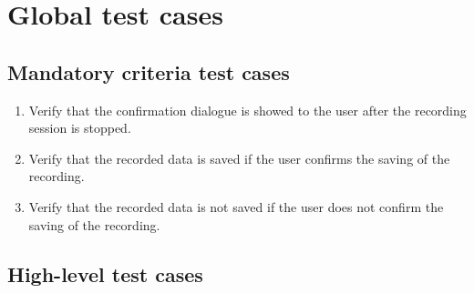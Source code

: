 \chapter{Global test cases}
\label{ch:tests}

\newcommand{\testfor}[1]{\addtocounter{counterTC}{10}\item[TC\arabic{counterTC}\label{TC\arabic{counterTC}}\\\begin{footnotesize}\textit{(tests \specref{#1})}\end{footnotesize}]}
\newcommand{\test}{\addtocounter{counterTC}{10}\item[TC\arabic{counterTC}\label{TC\arabic{counterTC}}]}
\newenvironment{tests}{\begin{enumerate}[font = \normalfont, style = multiline, labelindent = 0em, labelwidth = 5em, labelsep* = 1em, leftmargin = !]}{\end{enumerate}}

\section{Mandatory criteria test cases}

\begin{tests}
	\testfor{MC50}{Verify that the confirmation dialogue is showed to the \gls{user} after the recording \gls{session} is stopped.}
	\testfor{MC50}{Verify that the recorded data is saved if the \gls{user} confirms the saving of the recording.}
	\testfor{MC50}{Verify that the recorded data is not saved 
if the \gls{user} does not confirm the saving of the recording.}
\end{tests}

\section{High-level test cases}

